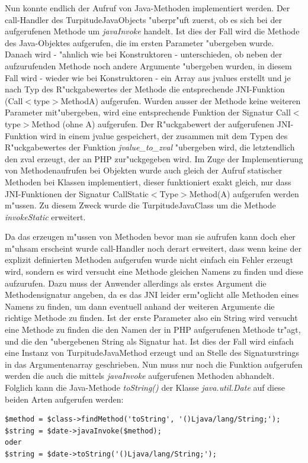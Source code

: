 Nun konnte endlich der Aufruf von Java-Methoden implementiert werden. Der call-Handler des TurpitudeJavaObjects "uberpr"uft zuerst, ob es sich bei der
aufgerufenen Methode um \emph{javaInvoke} handelt. Ist dies der Fall wird die Methode des Java-Objektes aufgerufen, die im ersten Parameter "ubergeben 
wurde. Danach wird - "ahnlich wie bei Konstruktoren - unterschieden, ob neben der aufzurufenden Methode noch andere Argumente "ubergeben wurden, in diesem
Fall wird - wieder wie bei Konstruktoren - ein Array aus jvalues erstellt und je nach Typ des R"uckgabewertes der Methode die entsprechende JNI-Funktion
(Call$<$type$>$MethodA) aufgerufen. Wurden ausser der Methode keine weiteren Parameter mit"ubergeben, wird eine entsprechende Funktion der Signatur
Call$<$type$>$Method (ohne A) aufgerufen. Der R"uckgabewert der aufgerufenen JNI-Funktion wird in einem jvalue gespeichert, der zusammen mit dem
Typen des R"uckgabewertes der Funktion \emph{jvalue\_to\_zval} "ubergeben wird, die letztendlich den zval erzeugt, der an PHP zur"uckgegeben wird.
Im Zuge der Implementierung von Methodenaufrufen bei Objekten wurde auch gleich der Aufruf statischer Methoden bei Klassen implementiert, dieser funktioniert exakt 
gleich, nur dass JNI-Funktionen der Signatur CallStatic$<$Type$>$Method(A) aufgerufen werden m"ussen. Zu diesem Zweck wurde die TurpitudeJavaClass um die Methode
\emph{invokeStatic} erweitert.

Da das erzeugen m"ussen von Methoden bevor man sie aufrufen kann doch eher m"uhsam erscheint wurde call-Handler noch derart erweitert, dass wenn keine der
explizit definierten Methoden aufgerufen wurde nicht einfach ein Fehler erzeugt wird, sondern es wird versucht eine Methode gleichen Namens zu finden und diese
aufzurufen. Dazu muss der Anwender allerdings als erstes Argument die Methodensignatur angeben, da es das JNI leider erm"oglicht alle Methoden eines Namens
zu finden, um dann eventuell anhand der weiteren Argumente die richtige Methode zu finden. Ist der erste Parameter also ein String wird versucht eine
Methode zu finden die den Namen der in PHP aufgerufenen Methode tr"agt, und die den "ubergebenen String als Signatur hat. Ist dies der Fall wird einfach 
eine Instanz von TurpitudeJavaMethod erzeugt und an Stelle des Signaturstrings in das Argumentenarray geschrieben. Nun muss nur noch die Funktion aufgerufen
werden die auch die mittels \emph{javaInvoke} aufgerufenen Methoden abhandelt. Folglich kann die Java-Methode \emph{toString()} der Klasse \emph{java.util.Date}
auf diese beiden Arten aufgerufen werden:
\begin{lstlisting}[caption=Zwei Arten die gleiche Methode aufzurufen]
$method = $class->findMethod('toString', '()Ljava/lang/String;');
$string = $date->javaInvoke($method);
oder
$string = $date->toString('()Ljava/lang/String;');
\end{lstlisting}

